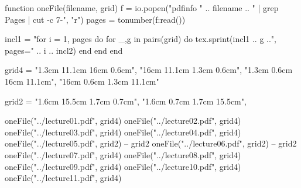 \documentclass[12pt,a4paper]{book}
\begin{document}
\begin{luacode}
	function oneFile(filename, grid)
		f = io.popen("pdfinfo " .. filename .. " | grep Pages | cut -c 7-", "r")
		pages = tonumber(f:read())

		incl1 = "\"

		for i = 1, pages do
			for _,g in pairs(grid) do
				tex.sprint(incl1 .. g ..", pages=" .. i .. incl2)
			end
		end
	end

	grid4 = {
		"1.3cm 11.1cm 16cm 0.6cm",
		"16cm 11.1cm 1.3cm 0.6cm",
		"1.3cm 0.6cm 16cm 11.1cm",
		"16cm 0.6cm 1.3cm 11.1cm"
	}

	grid2 = {
		"1.6cm 15.5cm 1.7cm 0.7cm",
		"1.6cm 0.7cm 1.7cm 15.5cm",
	}

	oneFile("../lecture01.pdf", grid4)
	oneFile("../lecture02.pdf", grid4)
	oneFile("../lecture03.pdf", grid4)
	oneFile("../lecture04.pdf", grid4)
	oneFile("../lecture05.pdf", grid2) -- grid2
	oneFile("../lecture06.pdf", grid2) -- grid2
	oneFile("../lecture07.pdf", grid4)
	oneFile("../lecture08.pdf", grid4)
	oneFile("../lecture09.pdf", grid4)
	oneFile("../lecture10.pdf", grid4)
	oneFile("../lecture11.pdf", grid4)
\end{luacode}
\end{document}

